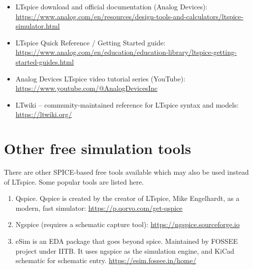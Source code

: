 \begin{itemize}
	\item LTspice download and official documentation (Analog Devices):\\ \url{https://www.analog.com/en/resources/design-tools-and-calculators/ltspice-simulator.html}
	\item LTspice Quick Reference / Getting Started guide: \url{https://www.analog.com/en/education/education-library/ltspice-getting-started-guides.html}
	\item Analog Devices LTspice video tutorial series (YouTube):\\ \url{https://www.youtube.com/@AnalogDevicesInc}
	\item LTwiki -- community-maintained reference for LTspice syntax and models:\\ \url{https://ltwiki.org/}
\end{itemize}
\section*{Other free simulation tools}
There are other SPICE-based free tools available which may also be used instead of LTspice. Some popular tools are listed here.
\begin{enumerate}
	\item Qspice. Qspice is created by the creator of LTspice, Mike Engelhardt, as a modern, fast simulator: \url{https://p.qorvo.com/get-qspice}
	\item Ngspice (requires a schematic capture tool): \url{https://ngspice.sourceforge.io}
	\item eSim is an EDA package that goes beyond spice. Maintained by FOSSEE project under IITB. It uses ngspice as the simulation engine, and KiCad schematic for schematic entry.
	\url{https://esim.fossee.in/home/}
\end{enumerate}